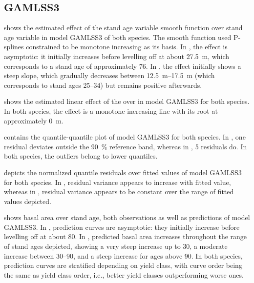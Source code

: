 \subsection{GAMLSS3}

 shows the estimated effect of the stand age variable smooth function over stand age variable in model GAMLSS3 of both species.  The smooth function used P-splines constrained to be monotone increasing as its basis.  In \Beech{}, the effect is asymptotic:  it initially increases before levelling off at about \SI{27.5}{\meter}, which corresponds to a stand age of approximately \SI{76}{\year}.  In \Spruce{}, the effect initially shows a steep slope, which gradually decreases between \SIrange{12.5}{17.5}{\meter} (which corresponds to stand ages \SIrange{25}{34}{\year}) but remains positive afterwards.

 shows the estimated linear effect of the \ProductivityIndexVariableText{} over \ProductivityIndexVariableText{} in model GAMLSS3 for both species.  In both species, the effect is a monotone increasing line with its root at approximately \SI{0}{\meter}.

 contains the quantile-quantile plot of model GAMLSS3 for both species.  In \Beech{}, one residual deviates outside the \SI{90}{\percent} reference band, whereas in \Spruce{}, \num{5} residuals do.  In both species, the outliers belong to lower quantiles.

 depicts the normalized quantile residuals over fitted values of model GAMLSS3 for both species.  In \Beech{}, residual variance appears to increase with fitted value, whereas in \Spruce{}, residual variance appears to be constant over the range of fitted values depicted.

 shows basal area over stand age, both observations as well as predictions of model GAMLSS3.  In \Beech{}, prediction curves are asymptotic:  they initially increase before levelling off at about \SI{80}{\year}.  In \Spruce{}, predicted basal area increases throughout the range of stand ages depicted, showing a very steep increase up to \SI{30}{\year}, a moderate increase between \SIrange{30}{90}{\year}, and a steep increase for ages above \SI{90}{\year}.  In both species, prediction curves are stratified depending on yield class, with curve order being the same as yield class order, i.e., better yield classes outperforming worse ones.

